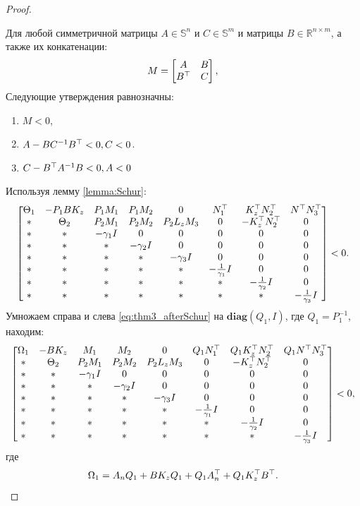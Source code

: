 \begin{proof}
\begin{lemma}
		Для любой симметричной матрицы ${A}\in \mathbb{S}^n$ и ${C}\in \mathbb{S}^m$ и матрицы ${B}\in \mathbb{R}^{n\times m}$, а также их конкатенации:
		\noindent \begin{align*}
			{M}= \begin{bmatrix}
				{A} & {B} \\
				{B}^\top & {C} 
			\end{bmatrix},
		\end{align*}
		Следующие утверждения равнозначны:
		\noindent
		\begin{enumerate}
			\item ${M} < 0$,
			\item ${A}-{B}{C}^{-1}{B}^\top < 0 , {C}< 0$.
			\item ${C}-{B}^\top{A}^{-1}{B}< 0 , {A}< 0$
		\end{enumerate}
	\end{lemma}
	
	Используя лемму {\ref{lemma:Schur}}:
		\begin{equation}
		\label{eq:thm3_afterSchur}
		\begin{bmatrix}
			{\Theta}_1 & -{P}_1{B}{K}_z & {P}_1{M}_1 & {P}_1{M}_2 &0& {N}_1^\top & {K}_z^\top{N}_2^\top  & {N}^\top{N}_3^\top 
			\\
			* & {\Theta}_2 & {P}_2{M}_1 & {P}_2{M}_2 & {P}_2{L}_z{M}_3 & 0 & -{K}_z^\top{N}_2^\top & 0\\
			* & * & -\gamma_1{I} & 0&0&0&0&0\\
			* & * & * & -\gamma_2{I}&0&0&0&0\\
			* & * & * & *&-\gamma_3{I}&0&0&0\\
			* & * & * & *&*&-\frac{1}{\gamma_1}{I}&0&0\\
			* & * & * & *&*&*&-\frac{1}{\gamma_2}{I}&0\\
			*&* & * & * & *&*&*&-\frac{1}{\gamma_3}{I}
		\end{bmatrix}<0.
	\end{equation}
	Умножаем справа и слева \ref{eq:thm3_afterSchur} на $\textbf{diag}({Q}_1, {I})$, где ${Q}_1 = {P}_1^{-1}$, находим:
	\begin{equation}
		\label{eq:thm3_before_Young}
		\begin{bmatrix}
			{\Omega}_1 & -{B}{K}_z & {M}_1 & {M}_2 & 0& {Q}_1{N}_1^\top & {Q}_1{K}_z^\top{N}_2^\top & {Q}_1 {N}^\top{N}_3^\top 
			\\
			* & {\Theta}_2 & {P}_2{M}_1 & {P}_2{M}_2 & {P}_2{L}_z{M}_3 & 0 & -{K}_z^\top{N}_2^\top & 0\\
			* & * & -\gamma_1{I} & 0&0&0&0&0\\
			* & * & * & -\gamma_2{I}&0&0&0&0\\
			* & * & * & *&-\gamma_3{I}&0&0&0\\
			* & * & * & *&*&-\frac{1}{\gamma_1}{I}&0&0\\
			* & * & * & *&*&*&-\frac{1}{\gamma_2}{I}&0\\
			*&* & * & * & *&*&*&-\frac{1}{\gamma_3}{I}
		\end{bmatrix}<0,
	\end{equation}
	где
	\begin{equation}
		{\Omega}_1={A}_n{Q}_1+{B}{K}_z{Q}_1+{Q}_1{A}_n^\top+{Q}_1{K}_z^\top{B}^\top.
	\end{equation}


\end{proof}
